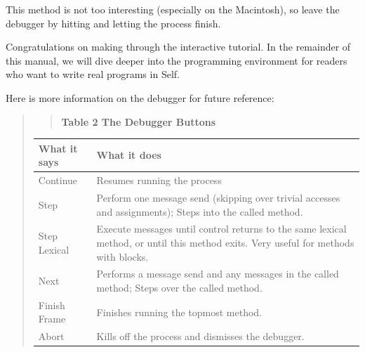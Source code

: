 \documentclass[letterpaper,10pt,english]{sphinxmanual}
\begin{document}
This method is not too interesting (especially on the Macintosh), so leave the debugger by hitting
 and letting the process finish.

Congratulations on making through the interactive tutorial. In the remainder of this manual, we
will dive deeper into the programming environment for readers who want to write real programs in
Self.

Here is more information on the debugger for future reference:
\begin{quote}
\begin{quote}

\textbf{Table 2 The Debugger Buttons}
\end{quote}

\begin{tabulary}{\linewidth}{|L|L|}
\hline
\textbf{
What it says
} & \textbf{
What it does
}\\\hline

Continue
 & 
Resumes running the process
\\\hline

Step
 & 
Perform one message send (skipping over trivial accesses and assignments); Steps into the called method.
\\\hline

Step Lexical
 & 
Execute messages until control returns to the same lexical method, or until this method exits. Very useful for methods with blocks.
\\\hline

Next
 & 
Performs a message send and any messages in the called method; Steps over the called method.
\\\hline

Finish Frame
 & 
Finishes running the topmost method.
\\\hline

Abort
 & 
Kills off the process and dismisses the debugger.
\\\hline
\end{tabulary}

\end{quote}
\end{document}
